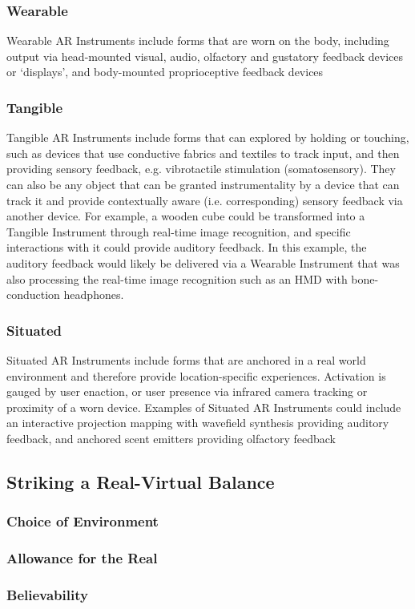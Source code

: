 \subsubsection{Wearable}
Wearable AR Instruments include forms that are worn on the body, including output via head-mounted visual, audio, olfactory and gustatory feedback devices or `displays', and body-mounted proprioceptive feedback devices

\subsubsection{Tangible}
Tangible AR Instruments include forms that can explored by holding or touching, such as devices that use conductive fabrics and textiles to track input, and then providing sensory feedback, e.g. vibrotactile stimulation (somatosensory). They can also be any object that can be granted instrumentality by a device that can track it and provide contextually aware (i.e. corresponding) sensory feedback via another device. For example, a wooden cube could be transformed into a Tangible Instrument through real-time image recognition, and specific interactions with it could provide auditory feedback. In this example, the auditory feedback would likely be delivered via a Wearable Instrument that was also processing the real-time image recognition such as an HMD with bone-conduction headphones.

\subsubsection{Situated}
Situated AR Instruments include forms that are anchored in a real world environment and therefore provide location-specific experiences. Activation is gauged by user enaction, or user presence via infrared camera tracking or proximity of a worn device. Examples of Situated AR Instruments could include an interactive projection mapping with wavefield synthesis providing auditory feedback, and anchored scent emitters providing olfactory feedback

\subsection{Striking a Real-Virtual Balance} \label{sec: discussion-patterns-environment}
\subsubsection{Choice of Environment}
\subsubsection{Allowance for the Real}
\subsubsection{Believability}